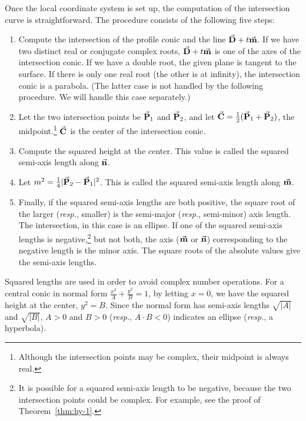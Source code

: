      Once the local coordinate system is set up, the computation of the
intersection curve is straightforward.  The procedure consists of the
following five steps:
\begin{enumerate}
     \item Compute the intersection of the profile conic and the line
          $\vec{\bf D}+t\vec{\bf m}$.  If we have two distinct real or conjugate
          complex roots, $\vec{\bf D}+t\vec{\bf m}$ is one of the axes of the
          intersection conic.  If we have a double root, the given plane
          is tangent to the surface.  If there is only one real root (the other
          is at infinity), the intersection conic is a parabola.
       (The latter case is not handled by the following procedure.
       We will handle this case separately.)
     \item Let the two intersection points be $\vec{\bf P}_1$ and $\vec{\bf P}_2$,
          and let $\vec{\bf C} = \frac{1}{2}(\vec{\bf P}_1 + \vec{\bf P}_2)$,
          the midpoint.\footnote{Although the intersection points may be
          complex, their midpoint is always real.}
          $\vec{\bf C}$ is the center of the intersection conic.
     \item Compute the squared height at the center.  This value is called the
          squared semi-axis length along $\vec{\bf n}$.
     \item Let $m^2 = \frac{1}{4} |\vec{\bf P}_2 - \vec{\bf P}_1|^2$.
          This is called the squared semi-axis length along $\vec{\bf m}$.
     \item Finally, if the squared semi-axis lengths are both positive, the
          square root of the larger ({\em resp.}, smaller) is the semi-major
          ({\em resp.}, semi-minor) axis length.  The intersection, in this case
          is an ellipse.  If one of the squared semi-axis lengths is
          negative,\footnote{It is possible for a squared semi-axis length
          to be negative, because the two intersection points could be complex.
       For example, see the proof of Theorem~\ref{thm:hy-1}.}
       but not both, the axis ($\vec{\bf m}$ or $\vec{\bf n}$) corresponding to the
          negative length is the minor axis.  The square roots of the absolute
          values give the semi-axis lengths.
\end{enumerate}
Squared lengths are used in order to avoid complex number operations.
For a central conic in normal form $\frac{x^2}{A}+\frac{y^2}{B}=1$,
by letting $x=0$, we have the squared height at the center, $y^2=B$.
Since the normal form has semi-axis lengths
$\sqrt{|A|}$ and $\sqrt{|B|}$,
$A>0$ and $B>0$ ({\em resp.}, $A\cdot B<0$) indicates an ellipse
({\em resp.}, a hyperbola).


